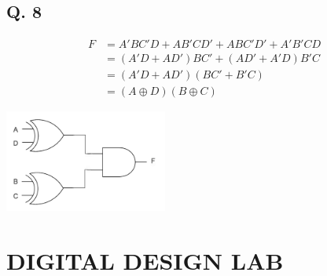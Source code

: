 \documentclass[onecolumn, oneside, ctexart]{SUSTechHomework}
\begin{document}
\subsection*{Q. 8}
\vspace{-5em}
\begin{align*}
F&=A'BC'D+AB'CD'+ABC'D'+A'B'CD\\
&=(A'D+AD')BC'+(AD'+A'D)B'C\\
&=(A'D+AD')(BC'+B'C)\\
&=(A\oplus D)(B\oplus C)
\end{align*}
\centerline{\includegraphics[width=0.4\textwidth]{8.jpeg}}
\pagebreak

\section{DIGITAL DESIGN LAB}
\end{document}

